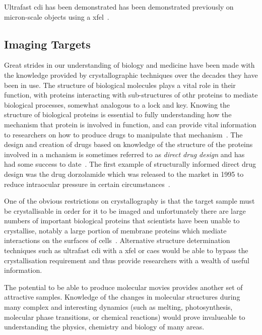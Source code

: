 Ultrafast \gls{cdi} has been demonstrated has been demonstrated previously on micron-scale objects using a \gls{xfel}~\cite{chapman_femtosecond_2006}.

\subsection{Imaging Targets}

Great strides in our understanding of biology and medicine have been made with the knowledge provided by crystallographic techniques over the decades they have been in use.
The structure of biological molecules plays a vital role in their function, with proteins interacting with sub-structures of othr proteins to mediate biological processes, somewhat analogous to a lock and key.
Knowing the structure of biological proteins is essential to fully understanding how the mechanism that protein is involved in function, and can provide vital information to researchers on how to produce drugs to manipulate that mechanism~\cite{aloy_structural_2006,almen_mapping_2009}.
The design and creation of drugs based on knowledge of the structure of the proteins involved in a mchanism is sometimes referred to as \emph{direct drug design} and has had some success to date~\cite{klebe_recent_2000,jhoti_structure-based_2007,mauser_recent_2008}.
The first example of structurally informed direct drug design was the drug dorzolamide which was released to the market in 1995 to reduce intraocular pressure in certain circumstances~\cite{greer_application_1994}.

One of the obvious restrictions on crystallography is that the target sample must be crystallisable in order for it to be imaged and unfortunately there are large numbers of important biological proteins that scientists have been unable to crystallise, notably a large portion of membrane proteins which mediate interactions on the surfaces of cells~\cite{geerlof_impact_2006}.
Alternative structure determination techniques such as ultrafast \gls{cdi} with a \gls{xfel} or \gls{caes} would be able to bypass the crystallisation requirement and thus provide researchers with a wealth of useful information.

The potential to be able to produce molecular movies provides another set of attractive samples.
Knowledge of the changes in molecular structures during many complex and interesting dynamics (such as melting, photosynthesis, molecular phase transitions, or chemical reactions) would prove invalueable to understanding the physics, chemistry and biology of many areas.

